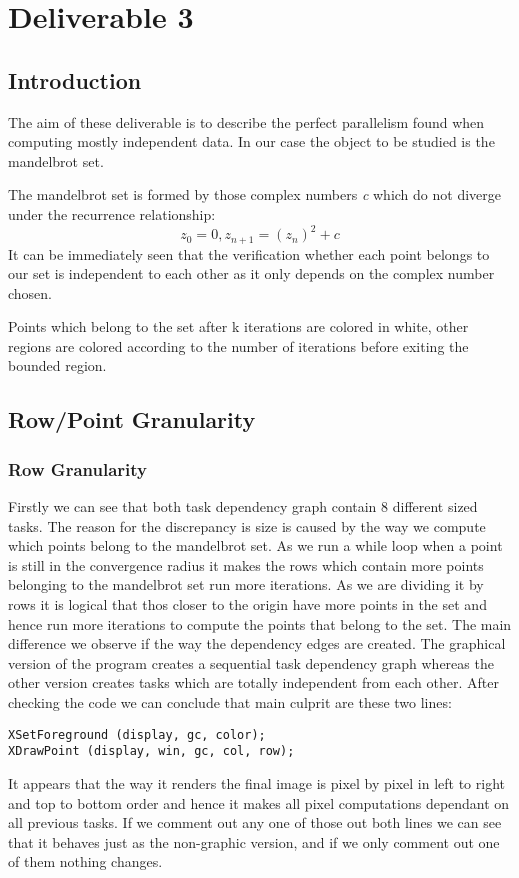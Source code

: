\documentclass[11pt]{article}
\author{par4113}
\date{\today}
\title{}
\begin{document}
\tableofcontents

\section{Deliverable 3}
\label{sec:org5114ca2}

\subsection{Introduction}
\label{sec:orgea23320}
The aim of these deliverable is to describe the perfect parallelism found when computing mostly independent data. In our case the object to be studied is the mandelbrot set.

The mandelbrot set is formed by those complex numbers \emph{c} which do not diverge under the recurrence relationship: \[ z_0 = 0, z_{n+1}=(z_n)^{2} + c \]
It can be immediately seen that the verification whether each point belongs to our set is independent to each other as it only depends on the complex number chosen.

Points which belong to the set after k iterations are colored in white, other regions are colored according to the number of iterations before exiting the bounded region.

\subsection{Row/Point Granularity}
\label{sec:org021773f}

\subsubsection{Row Granularity}
\label{sec:orgb7f1c1f}
Firstly we can see that both task dependency graph contain 8 different sized tasks. The reason for the discrepancy is size is caused by the way we compute which points belong to the mandelbrot set. As we run a while loop when a point is still in the convergence radius it makes the rows which contain more points belonging to the mandelbrot set run more iterations. As we are dividing it by rows it is logical that thos closer to the origin have more points in the set and hence run more iterations to compute the points that belong to the set.
The main difference we observe if the way the dependency edges are created. The graphical version of the program creates a sequential task dependency graph whereas the other version creates tasks which are totally independent from each other. After checking the code we can conclude that main culprit are these two lines:
\begin{verbatim}
XSetForeground (display, gc, color);
XDrawPoint (display, win, gc, col, row);
\end{verbatim}
It appears that the way it renders the final image is pixel by pixel in left to right and top to bottom order and hence it makes all pixel computations dependant on all previous tasks. If we comment out any one of those out both lines we can see that it behaves just as the non-graphic version, and if we only comment out one of them nothing changes.
\end{document}
